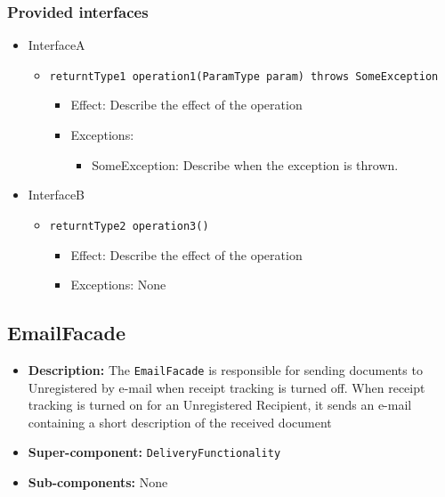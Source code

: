 \documentclass[a4paper,10pt]{article}
\begin{document}
\subsubsection*{Provided interfaces}
\begin{itemize}
    \item InterfaceA
    \begin{itemize}
        \item \texttt{returntType1 operation1(ParamType param) throws SomeException}
        \begin{itemize}
            \item Effect: Describe the effect of the operation
            \item Exceptions:
            \begin{itemize}
                \item SomeException: Describe when the exception is thrown.
            \end{itemize}
        \end{itemize}
    \end{itemize}

    \item InterfaceB
    \begin{itemize}
        \item \texttt{returntType2 operation3()}
        \begin{itemize}
            \item Effect: Describe the effect of the operation
            \item Exceptions: None
        \end{itemize}
    \end{itemize}
\end{itemize}

\subsection{EmailFacade}
\begin{itemize}
    \item \textbf{Description:} The \texttt{EmailFacade} is responsible for sending documents to  Unregistered by e-mail when receipt tracking is turned off. When receipt tracking is turned on for an Unregistered Recipient, it sends an e-mail containing a short description of the received document
    \item \textbf{Super-component:} \texttt{DeliveryFunctionality}
    \item \textbf{Sub-components:} None
\end{itemize}
\end{document}
